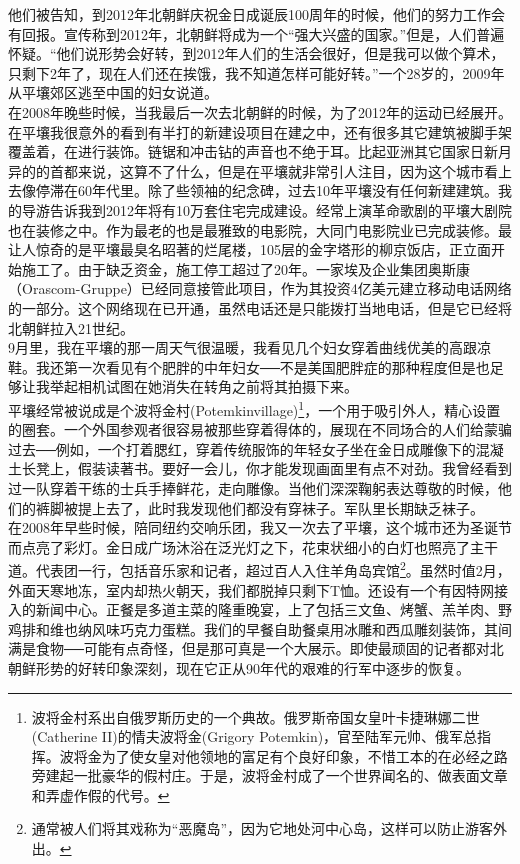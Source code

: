 \begin{multicols}{\theparacolNo}
他们被告知，到2012年北朝鲜庆祝金日成诞辰100周年的时候，他们的努力工作会有回报。宣传称到2012年，北朝鲜将成为一个“强大兴盛的国家。”但是，人们普遍怀疑。“他们说形势会好转，到2012年人们的生活会很好，但是我可以做个算术，只剩下2年了，现在人们还在挨饿，我不知道怎样可能好转。”一个28岁的，2009年从平壤郊区逃至中国的妇女说道。\\

在2008年晚些时候，当我最后一次去北朝鲜的时候，为了2012年的运动已经展开。在平壤我很意外的看到有半打的新建设项目在建之中，还有很多其它建筑被脚手架覆盖着，在进行装饰。链锯和冲击钻的声音也不绝于耳。比起亚洲其它国家日新月异的的首都来说，这算不了什么，但是在平壤就非常引人注目，因为这个城市看上去像停滞在60年代里。除了些领袖的纪念碑，过去10年平壤没有任何新建建筑。我的导游告诉我到2012年将有10万套住宅完成建设。经常上演革命歌剧的平壤大剧院也在装修之中。作为最老的也是最雅致的电影院，大同门电影院业已完成装修。最让人惊奇的是平壤最臭名昭著的烂尾楼，105层的金字塔形的柳京饭店，正立面开始施工了。由于缺乏资金，施工停工超过了20年。一家埃及企业集团奥斯康（Orascom-Gruppe）已经同意接管此项目，作为其投资4亿美元建立移动电话网络的一部分。这个网络现在已开通，虽然电话还是只能拨打当地电话，但是它已经将北朝鲜拉入21世纪。\\

9月里，我在平壤的那一周天气很温暖，我看见几个妇女穿着曲线优美的高跟凉鞋。我还第一次看见有个肥胖的中年妇女──不是美国肥胖症的那种程度但是也足够让我举起相机试图在她消失在转角之前将其拍摄下来。\\

平壤经常被说成是个波将金村(Potemkinvillage)\footnote{波将金村系出自俄罗斯历史的一个典故。俄罗斯帝国女皇叶卡捷琳娜二世(Catherine II)的情夫波将金(Grigory Potemkin)，官至陆军元帅、俄军总指挥。波将金为了使女皇对他领地的富足有个良好印象，不惜工本的在必经之路旁建起一批豪华的假村庄。于是，波将金村成了一个世界闻名的、做表面文章和弄虚作假的代号。}，一个用于吸引外人，精心设置的圈套。一个外国参观者很容易被那些穿着得体的，展现在不同场合的人们给蒙骗过去──例如，一个打着腮红，穿着传统服饰的年轻女子坐在金日成雕像下的混凝土长凳上，假装读著书。要好一会儿，你才能发现画面里有点不对劲。我曾经看到过一队穿着干练的士兵手捧鲜花，走向雕像。当他们深深鞠躬表达尊敬的时候，他们的裤脚被提上去了，此时我发现他们都没有穿袜子。军队里长期缺乏袜子。\\

在2008年早些时候，陪同纽约交响乐团，我又一次去了平壤，这个城市还为圣诞节而点亮了彩灯。金日成广场沐浴在泛光灯之下，花束状细小的白灯也照亮了主干道。代表团一行，包括音乐家和记者，超过百人入住羊角岛宾馆\footnote{通常被人们将其戏称为“恶魔岛”，因为它地处河中心岛，这样可以防止游客外出。}。虽然时值2月，外面天寒地冻，室内却热火朝天，我们都脱掉只剩下T恤。还设有一个有因特网接入的新闻中心。正餐是多道主菜的隆重晚宴，上了包括三文鱼、烤蟹、羔羊肉、野鸡排和维也纳风味巧克力蛋糕。我们的早餐自助餐桌用冰雕和西瓜雕刻装饰，其间满是食物──可能有点奇怪，但是那可真是一个大展示。即使最顽固的记者都对北朝鲜形势的好转印象深刻，现在它正从90年代的艰难的行军中逐步的恢复。\\


\end{multicols}
